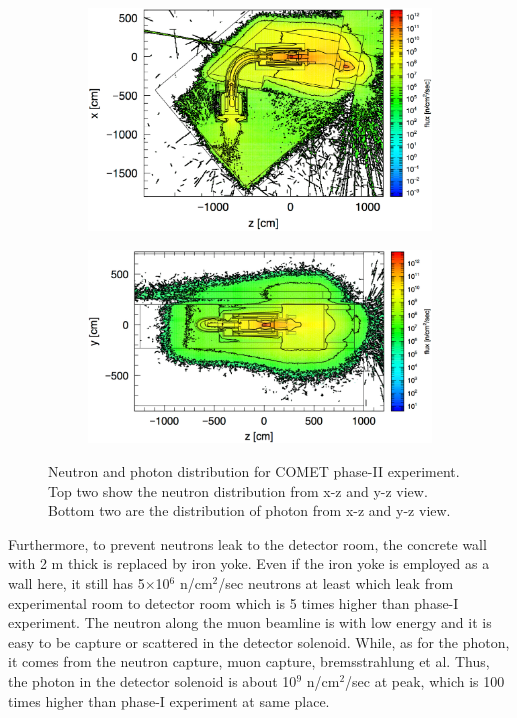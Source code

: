  \begin{figure}[H]
   \begin{subfigure}{0.26\textwidth}
   \centering
   \includegraphics[scale=0.36]{chapter3/fig/photonzx.pdf}
   \end{subfigure}
   \hspace{0.2\textwidth}
   \begin{subfigure}{0.26\textwidth}
   \centering
   \includegraphics[scale=0.34]{chapter3/fig/photonyz.pdf}
   \end{subfigure}
   \caption{Neutron and photon distribution for COMET phase-II experiment. Top two show the neutron distribution from x-z and y-z view. Bottom two are the distribution of photon from x-z and y-z view.}
   \label{2photon}
  \end{figure}
Furthermore, to prevent neutrons leak to the detector room, the concrete wall with 2 m thick is replaced by iron yoke.
Even if the iron yoke is employed as a wall here, it still has 5$\times$10$^6$ n/cm$^2$/sec neutrons at least which leak from experimental room to detector room which is 5 times higher than phase-I experiment.
The neutron along the muon beamline is with low energy and it is easy to be capture or scattered in the detector solenoid.
While, as for the photon, it comes from the neutron capture, muon capture, bremsstrahlung et al.
Thus, the photon in the detector solenoid is about 10$^9$ n/cm$^2$/sec at peak, which is 100 times higher than phase-I experiment at same place.

